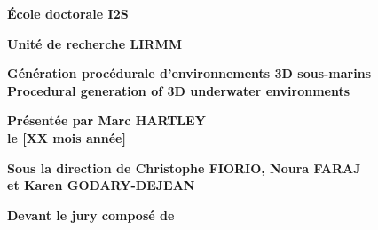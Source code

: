 \begin{titlepage}
{		\bigskip
		\textbf{École doctorale I2S}
		
		\bigskip
		\textbf{Unité de recherche LIRMM}
		
		
		\color{Titleblue}
		\fontsize{17}{20.4}\selectfont
		\vspace{2cm}
		\textbf{Génération procédurale d'environnements 3D sous-marins\\Procedural generation of 3D underwater environments}
		
		
		\vspace{4cm}
		\fontsize{15}{18}\selectfont
		\color{black}
		\textbf{Présentée par Marc HARTLEY \\
			le [XX mois année]}
		
		\bigskip
		\fontsize{13}{15.6}\selectfont
		\textbf{Sous la direction de Christophe FIORIO, 
			Noura FARAJ \\
			et Karen GODARY-DEJEAN}
		
		\vspace{1.5cm}
		\normalsize
		\textbf{Devant le jury composé de}\\
		\bigskip
		\fontsize{10}{12}\selectfont
		\vspace{1.5mm}
		\begin{tabularx}{\textwidth}{l X r}


\end{tabularx}}
\end{titlepage}
